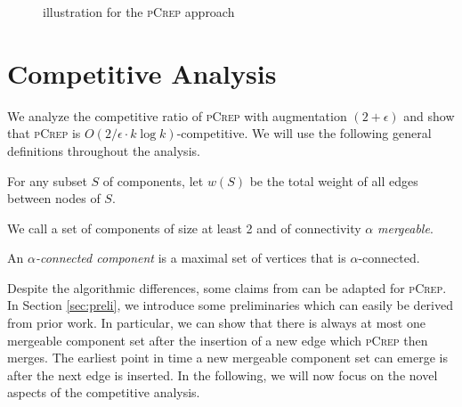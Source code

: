 \documentclass[a4paper,UKenglish,cleveref, autoref, thm-restate,authorcolumns]{lipics-v2019}
\newcommand{\adjDel}{\textsc{pCrep}}
\newcommand{\request}[3]{\draw (axis cs:#3,#1) -- node[left]{} (axis cs:#3,#2);}
\begin{document}
\begin{figure}
	\centering
	\caption{illustration for the \adjDel{} approach}\label{exOldCrep}
	
\end{figure}		

\section{Competitive Analysis}
\label{comp_analysis_section}

We analyze the competitive ratio of \adjDel{} with augmentation $(2+\epsilon)$ and show that \adjDel{} is $O(2/\epsilon\cdot k\log k)$-competitive.
We will use the following general definitions 
throughout the analysis.

\begin{definition}
	For any subset $S$ of components, let $w(S)$ be 
	the total weight of all edges between nodes of $S$.
\end{definition}

\begin{definition}
	We call a set of components of size at least 2 and of connectivity $\alpha$ 
	\textit{mergeable}.	
\end{definition}

\begin{definition}
	An $\alpha$\textit{-connected component} is a maximal set of vertices that is $\alpha$-connected.
\end{definition}

Despite the algorithmic differences, some claims
from \cite{Avin2015} can be adapted for \adjDel{}.
In Section \ref{sec:preli}, we introduce some preliminaries
which can easily be derived from prior work. 
In particular, we can show that there is always at most one mergeable component set after the insertion of a new edge which \adjDel{} then merges. The earliest point in time a new mergeable component set can emerge is after the next edge is inserted. 
In the following, we will now focus on the novel aspects of
the competitive analysis.
\end{document}
